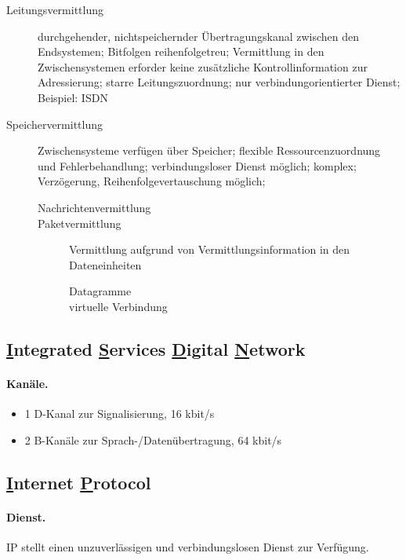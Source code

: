 \documentclass[]{scrartcl}
\begin{document}
\begin{description}
\item[Leitungsvermittlung] durchgehender, nichtspeichernder \"Ubertragungskanal zwischen den Endsystemen; Bitfolgen reihenfolgetreu; Vermittlung in den Zwischensystemen erforder keine zus\"atzliche Kontrollinformation zur Adressierung; starre Leitungszuordnung; nur verbindungorientierter Dienst; Beispiel: ISDN
\item[Speichervermittlung]  Zwischensysteme verf\"ugen \"uber Speicher; flexible Ressourcenzuordnung und Fehlerbehandlung; verbindungsloser Dienst m\"oglich; komplex; Verz\"ogerung, Reihenfolgevertauschung m\"oglich;
 \begin{description}
\item[Nachrichtenvermittlung]
\item[Paketvermittlung] Vermittlung aufgrund von Vermittlungsinformation in den Dateneinheiten
\begin{description}
\item[Datagramme]
\item[virtuelle Verbindung]
\end{description}

\end{description}

\end{description}

\subsection{\underline{I}ntegrated \underline{S}ervices \underline{D}igital \underline{N}etwork}

\paragraph{Kan\"ale.}
\begin{itemize}
\item 1 D-Kanal zur Signalisierung, 16 kbit/s
\item 2 B-Kan\"ale zur Sprach-/Daten\"ubertragung, 64 kbit/s
\end{itemize}


\subsection{\underline{I}nternet \underline{P}rotocol}

\paragraph{Dienst.} IP stellt einen unzuverl\"assigen und verbindungslosen Dienst zur Verf\"ugung.
\end{document}
